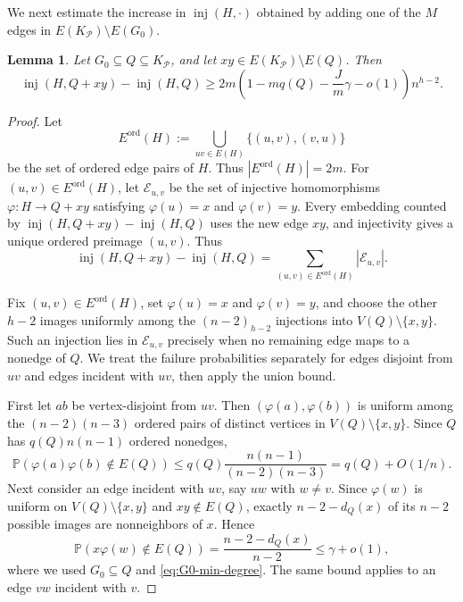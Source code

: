 \documentclass[11pt]{article}
\numberwithin{equation}{section}
\newtheorem{lemma}[theorem]{Lemma}
\theoremstyle{definition}
\theoremstyle{remark}
\newcommand{\inj}{\operatorname{inj}}
\newcommand{\Prb}{\mathbb P}
\newcommand{\cP}{\mathcal P}
\newcommand{\cE}{\mathcal E}
\begin{document}
We next estimate the increase in $\inj(H,\cdot)$ obtained by adding one of the
$M$ edges in \mbox{$E(K_{\cP})\setminus E(G_0)$}.

\begin{lemma}
\label{lem:completion}
Let $G_0\subseteq Q\subseteq K_{\cP}$, and let $xy\in E(K_{\cP})\setminus E(Q)$. Then
\[
\inj(H,Q+xy)-\inj(H,Q)
\ge 2m\left(1-mq(Q)-\frac{J}{m}\gamma-o(1)\right)n^{h-2}.
\]
\end{lemma}

\begin{proof}
Let
\[
E^{\mathrm{ord}}(H):=\bigcup_{uv\in E(H)}\{(u,v),(v,u)\}
\]
be the set of ordered edge pairs of $H$. Thus $|E^{\mathrm{ord}}(H)|=2m$.
For $(u,v)\in E^{\mathrm{ord}}(H)$, let $\cE_{u,v}$ be the set of injective homomorphisms $\varphi:H\to Q+xy$ satisfying $\varphi(u)=x$ and $\varphi(v)=y$. Every embedding counted by $\inj(H,Q+xy)-\inj(H,Q)$ uses the new edge $xy$, and injectivity gives a unique ordered preimage $(u,v)$. Thus
\begin{equation}
\label{eq:completion-orientations}
\inj(H,Q+xy)-\inj(H,Q)=\sum_{(u,v)\in E^{\mathrm{ord}}(H)}|\cE_{u,v}|.
\end{equation}

Fix $(u,v)\in E^{\mathrm{ord}}(H)$, set $\varphi(u)=x$ and $\varphi(v)=y$, and choose the other $h-2$ images uniformly among the $(n-2)_{h-2}$ injections into $V(Q)\setminus\{x,y\}$. Such an injection lies in $\cE_{u,v}$ precisely when no remaining edge maps to a nonedge of $Q$. We treat the failure probabilities separately for edges disjoint from $uv$ and edges incident with $uv$, then apply the union bound.

First let $ab$ be vertex-disjoint from $uv$. Then $(\varphi(a),\varphi(b))$ is uniform among the $(n-2)(n-3)$ ordered pairs of distinct vertices in $V(Q)\setminus\{x,y\}$. Since $Q$ has $q(Q)n(n-1)$ ordered nonedges,
\[
\Prb(\varphi(a)\varphi(b)\notin E(Q))
\le q(Q)\frac{n(n-1)}{(n-2)(n-3)}
=q(Q)+O(1/n).
\]
Next consider an edge incident with $uv$, say $uw$ with $w\ne v$. Since $\varphi(w)$ is uniform on $V(Q)\setminus\{x,y\}$ and $xy\notin E(Q)$, exactly $n-2-d_Q(x)$ of its $n-2$ possible images are nonneighbors of $x$. Hence
\[
\Prb(x\varphi(w)\notin E(Q))
=\frac{n-2-d_Q(x)}{n-2}\le \gamma+o(1),
\]
where we used $G_0\subseteq Q$ and \eqref{eq:G0-min-degree}. The same bound applies to an edge $vw$ incident with $v$.


\end{proof}
\end{document}
